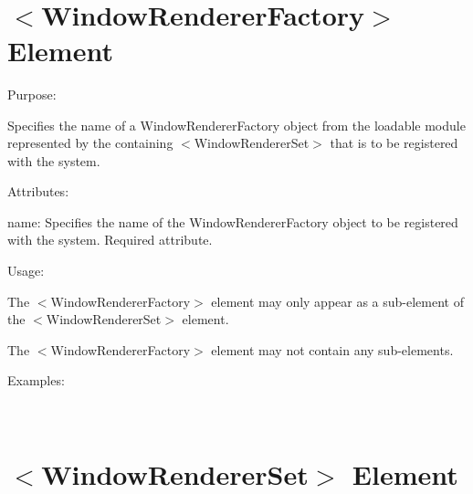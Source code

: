~\newline
 \hypertarget{xml_scheme_xml_scheme_windowrendererfactory}{}\section{$<$\+Window\+Renderer\+Factory$>$ Element}\label{xml_scheme_xml_scheme_windowrendererfactory}

\begin{DoxyItemize}
\item Purpose\+:
\begin{DoxyItemize}
\item Specifies the name of a Window\+Renderer\+Factory object from the loadable module represented by the containing $<$Window\+Renderer\+Set$>$ that is to be registered with the system.
\end{DoxyItemize}
\item Attributes\+:
\begin{DoxyItemize}
\item {\ttfamily name\+:} Specifies the name of the Window\+Renderer\+Factory object to be registered with the system. Required attribute.
\end{DoxyItemize}
\item Usage\+:
\begin{DoxyItemize}
\item The $<$Window\+Renderer\+Factory$>$ element may only appear as a sub-\/element of the $<$Window\+Renderer\+Set$>$ element.
\item The $<$Window\+Renderer\+Factory$>$ element may not contain any sub-\/elements.
\end{DoxyItemize}
\item Examples\+:
\end{DoxyItemize}

~\newline
 \hypertarget{xml_scheme_xml_scheme_windowrendererset}{}\section{$<$\+Window\+Renderer\+Set$>$ Element}\label{xml_scheme_xml_scheme_windowrendererset}

